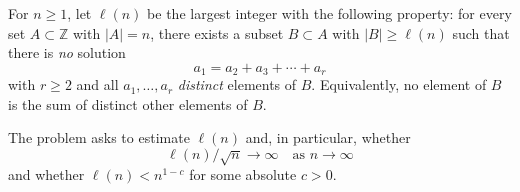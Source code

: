 For $n\ge 1$, let $\ell(n)$ be the largest integer with the following property:
for every set $A\subset \mathbb Z$ with $|A|=n$, there exists a subset $B\subset A$ with
$|B|\ge \ell(n)$ such that there is \emph{no} solution
\[
 a_1 = a_2 + a_3 + \cdots + a_r
\]
with $r\ge 2$ and all $a_1,\dots,a_r$ \emph{distinct} elements of $B$.
Equivalently, no element of $B$ is the sum of distinct other elements of $B$.

The problem asks to estimate $\ell(n)$ and, in particular, whether
\[\ell(n)/\sqrt n \to \infty\quad\text{as }n\to\infty\]
and whether $\ell(n)< n^{1-c}$ for some absolute $c>0$.
